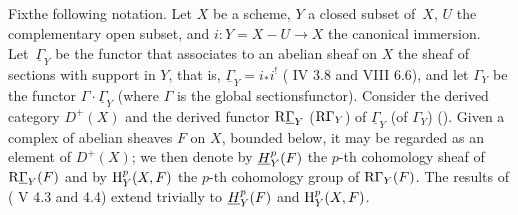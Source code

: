\subsection{}\label{XIV.1.0}
Fix\pageoriginale the following notation. Let $X$ be a scheme, $Y$ a closed subset of~$X$, $U$ the complementary open subset, and $i:Y=X-U\to X$ the canonical immersion. Let~$\underline{\Gamma}_Y$ be the functor that associates to an abelian sheaf on $X$ the \og sheaf of sections with support in $Y$\fg, that is, $\underline{\Gamma}_Y=i_*i^!$ (\cf {} IV 3.8 and VIII 6.6), and let $\Gamma_Y$ be the functor $\Gamma\cdot \underline{\Gamma}_Y$ (where $\Gamma$ is the \og global sections\fg functor). Consider the derived category $D^+(X)$ and the derived functor $\mathrm R\underline{\Gamma}_Y$ (\resp $\mathrm R\Gamma_Y$) of $\underline{\Gamma}_Y$ (\resp of $\Gamma_Y$) (\cf \cite{XIV.3}). Given a complex of abelian sheaves $F$ on $X$, bounded below, it may be regarded as an element of $D^+(X)$; we then denote by ${\mathop{\underline{H}}\nolimits}_Y^p(F)$ the $p$-th cohomology sheaf of $\mathrm R\underline{\Gamma}_Y(F)$ and by $\mathrm H_Y^p(X, F)$ the $p$-th cohomology group of $\mathrm R\Gamma_Y(F)$. The results of ( V 4.3 and 4.4) extend trivially to ${\mathop{\underline{H}}\nolimits}_Y^p(F)$ and $\mathrm H_Y^p(X, F)$.

